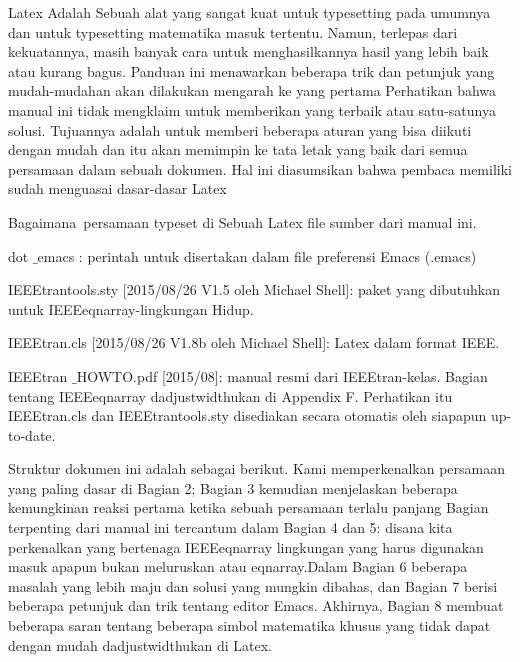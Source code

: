 \sloppy
 \hspace*{0.5in} Latex Adalah Sebuah alat yang sangat kuat untuk typesetting pada umumnya dan untuk typesetting matematika masuk tertentu. Namun, terlepas dari kekuatannya, masih banyak cara untuk menghasilkannya hasil yang lebih baik atau kurang bagus. Panduan ini menawarkan beberapa trik dan petunjuk yang mudah-mudahan akan dilakukan mengarah ke yang pertama Perhatikan bahwa manual ini tidak mengklaim untuk memberikan yang terbaik atau satu-satunya solusi. Tujuannya adalah untuk memberi beberapa aturan yang bisa diikuti dengan mudah dan itu akan memimpin ke tata letak yang baik dari semua persamaan dalam sebuah dokumen. Hal ini diasumsikan bahwa pembaca memiliki sudah menguasai dasar-dasar Latex \par
\noindent 
\vspace{12pt}
\noindent 
\vspace{12pt}
\noindent 
Bagaimana~persamaan typeset di  Sebuah Latex file sumber dari manual ini. \par
\noindent 
\vspace{12pt}
\noindent 
 dot $  \_  $emacs : perintah untuk disertakan dalam file preferensi Emacs (.emacs) \par
\noindent 
 IEEEtrantools.sty [2015/08/26 V1.5 oleh Michael Shell]: paket yang dibutuhkan untuk IEEEeqnarray-lingkungan Hidup. \par
\noindent 
 IEEEtran.cls [2015/08/26 V1.8b oleh Michael Shell]: Latex dalam format IEEE. \par
\noindent 
 IEEEtran $  \_  $HOWTO.pdf [2015/08]: manual resmi dari IEEEtran-kelas. Bagian tentang IEEEeqnarray dadjustwidthukan di Appendix F. Perhatikan itu IEEEtran.cls dan IEEEtrantools.sty disediakan secara otomatis oleh siapapun up-to-date.\
 \par
\noindent 
\vspace{12pt}
\noindent 
 \hspace*{0.5in} Struktur dokumen ini adalah sebagai berikut. Kami memperkenalkan persamaan yang paling dasar di Bagian 2; Bagian 3 kemudian menjelaskan beberapa kemungkinan reaksi pertama ketika sebuah persamaan terlalu panjang Bagian terpenting dari manual ini tercantum dalam Bagian 4 dan 5: disana kita perkenalkan yang bertenaga IEEEeqnarray lingkungan yang harus digunakan masuk apapun bukan meluruskan atau eqnarray.Dalam Bagian 6 beberapa masalah yang lebih maju dan solusi yang mungkin dibahas, dan Bagian 7 berisi beberapa petunjuk dan trik tentang editor Emacs. Akhirnya, Bagian 8 membuat beberapa saran tentang beberapa simbol matematika khusus yang tidak dapat dengan mudah dadjustwidthukan di Latex. \par
